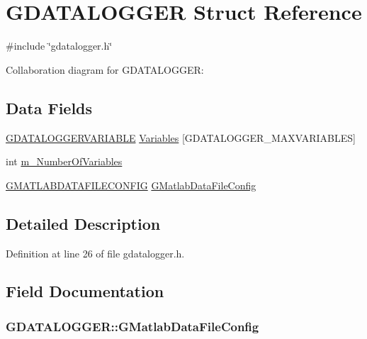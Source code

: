 \hypertarget{structGDATALOGGER}{
\section{GDATALOGGER Struct Reference}
\label{structGDATALOGGER}
}


{\ttfamily \#include \char`\"{}gdatalogger.h\char`\"{}}



Collaboration diagram for GDATALOGGER:\subsection*{Data Fields}
\begin{DoxyCompactItemize}
\item 
\hyperlink{structGDATALOGGERVARIABLE}{GDATALOGGERVARIABLE} \hyperlink{structGDATALOGGER_a6af9584d8665205b950cb2dcc5f90a94}{Variables} \mbox{[}GDATALOGGER\_\-MAXVARIABLES\mbox{]}
\item 
int \hyperlink{structGDATALOGGER_a2ac727ee6c50f7e04030cbe531158f08}{m\_\-NumberOfVariables}
\item 
\hyperlink{structGMATLABDATAFILECONFIG}{GMATLABDATAFILECONFIG} \hyperlink{structGDATALOGGER_a062fd3836dbd0b1bec129ab372bff04a}{GMatlabDataFileConfig}
\end{DoxyCompactItemize}


\subsection{Detailed Description}


Definition at line 26 of file gdatalogger.h.



\subsection{Field Documentation}
\hypertarget{structGDATALOGGER_a062fd3836dbd0b1bec129ab372bff04a}{
\subsubsection[{GMatlabDataFileConfig}]{ {\bf GDATALOGGER::GMatlabDataFileConfig}}}
\label{structGDATALOGGER_a062fd3836dbd0b1bec129ab372bff04a}


